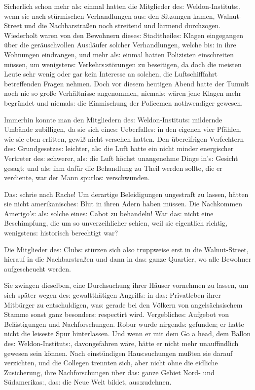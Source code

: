 \documentclass[oneside,12pt]{book}
\newenvironment{antiqua}{\normalfont}{}
\newcommand{\s}{s:}
\begin{document}
Sicherlich schon mehr al{\s} einmal hatten die Mitglieder de{\s}
Weldon-Institut{\s}, wenn sie nach st\"urmischen Verhandlungen au{\s}
den Sitzungen kamen, Walnut-Street und die Nachbarstra{\ss}en noch
streitend und l\"armend durchzogen. Wiederholt waren von den
Bewohnern diese{\s} Stadttheile{\s} Klagen eingegangen \"uber die
ger\"auschvollen Au{\s}l\"aufer solcher Verhandlungen, welche bi{\s}
in ihre Wohnungen eindrangen, und mehr al{\s} einmal hatten
Polizisten einschreiten m\"ussen, um wenigsten{\s}
Verkehr{\s}st\"orungen zu beseitigen, da doch die meisten Leute sehr
wenig oder gar kein Interesse an solchen, die Luftschifffahrt
betreffenden Fragen nehmen. Doch vor diesem heutigen Abend hatte der
Tumult noch nie so gro{\ss}e Verh\"altnisse angenommen, niemal{\s}
w\"aren jene Klagen mehr begr\"undet und niemal{\s} die Einmischung
der Policemen nothwendiger gewesen.

Immerhin konnte man den Mitgliedern de{\s} Weldon-Institut{\s}
mildernde Umb\"ande zubilligen, da sie sich eine{\s} Ueberfalle{\s}
in den eigenen vier Pf\"ahlen, wie sie eben erlitten, gewi{\ss} nicht
versehen hatten. Den \"ubereifrigen Verfechtern de{\s} Grundgesetze{\s}
{\glqq}leichter, al{\s} die Luft{\grqq} hatte ein nicht minder
energischer Vertreter de{\s} {\glqq}schwerer, al{\s} die Luft{\grqq}
h\"ochst unangenehme Dinge in'{\s} Gesicht gesagt; und al{\s} ihm
daf\"ur die Behandlung zu Theil werden sollte, die er verdiente, war
der Mann spurlo{\s} verschwunden.

Da{\s} schrie nach Rache! Um derartige Beleidigungen ungestraft zu
lassen, h\"atten sie nicht amerikanische{\s} Blut in ihren Adern
haben m\"ussen. Die Nachkommen Amerigo'{\s} al{\s} solche eine{\s}
Cabot zu behandeln! War da{\s} nicht eine Beschimpfung, die um so
unverzeihlicher schien, weil sie eigentlich richtig, wenigsten{\s}
historisch berechtigt war?

Die Mitglieder de{\s} Club{\s} st\"urzen sich also truppweise erst in
die Walnut-Street, hierauf in die Nachbarstra{\ss}en und dann in
da{\s} ganze Quartier, wo alle Bewohner aufgescheucht werden.

Sie zwingen dieselben, eine Durchsuchung ihrer H\"auser vornehmen zu
lassen, um sich sp\"ater wegen de{\s} gewaltth\"atigen Angriff{\s} in
da{\s} Privatleben ihrer Mitb\"urger zu entschuldigen, wa{\s} gerade
bei den V\"olkern von angels\"achsischem Stamme sonst ganz
besonder{\s} respectirt wird. Vergebliche{\s} Aufgebot von
Bel\"astigungen und Nachforschungen. Robur wurde nirgend{\s}
gefunden; er hatte nicht die leiseste Spur hinterlassen. Und wenn er
mit dem \begin{antiqua}Go a head\end{antiqua}, dem Ballon de{\s}
Weldon-Institut{\s}, davongefahren w\"are, h\"atte er nicht mehr
unauf\/findlich gewesen sein k\"onnen. Nach einst\"undigen
Hau{\s}suchungen mu{\ss}ten sie darauf verzichten, und die Collegen
trennten sich, aber nicht ohne die eidliche Zusicherung, ihre
Nachforschungen \"uber da{\s} ganze Gebiet Nord- und
S\"udamerika{\s}, da{\s} die Neue Welt bildet, au{\s}zudehnen.
\end{document}
